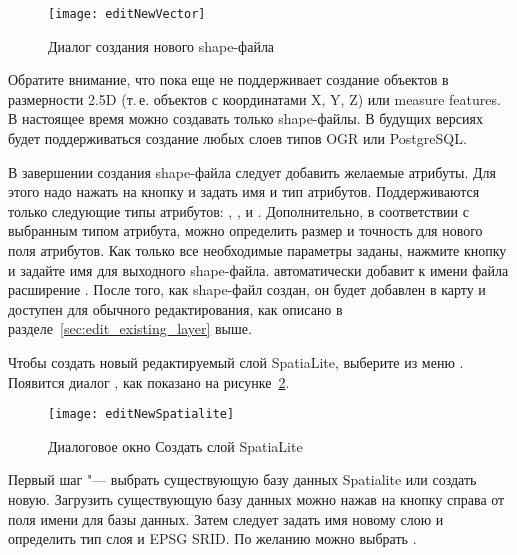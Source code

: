 \begin{figure}[ht]
   \centering
   \texttt{[image: editNewVector]}
   \caption{Диалог создания нового shape-файла \nixcaption}\label{fig:newvectorlayer}
\end{figure}

Обратите внимание, что \qg пока еще не поддерживает создание объектов в
размерности 2.5D (т.\,е. объектов с координатами X, Y, Z) или measure features.
В настоящее время можно создавать только shape-файлы. В будущих
версиях \qg будет поддерживаться создание любых слоев типов OGR или PostgreSQL.

В завершении создания shape-файла следует добавить желаемые атрибуты. Для
этого надо нажать на кнопку   и задать имя и тип атрибутов.
Поддерживаются только следующие типы атрибутов:  ,
, и .
Дополнительно, в соответствии с выбранным типом атрибута, можно определить
размер и точность для нового поля атрибутов. Как только все необходимые
параметры заданы, нажмите кнопку  и задайте имя для выходного
shape-файла. \qg автоматически добавит к имени файла расширение .
После того, как shape-файл создан, он будет добавлен в карту и доступен для
обычного редактирования, как описано в разделе~\ref{sec:edit_existing_layer} выше.

\label{sec:create spatialite}

Чтобы создать новый редактируемый слой SpatiaLite, выберите 
\arrow {} из меню
. Появится диалог , как
показано на рисунке~\ref{fig:newspatialitelayer}.

\begin{figure}[ht]
   \centering
   \texttt{[image: editNewSpatialite]}
   \caption{Диалоговое окно Создать слой SpatiaLite \nixcaption}\label{fig:newspatialitelayer}
\end{figure}

Первый шаг "--- выбрать существующую базу данных Spatialite или создать
новую. Загрузить существующую базу данных можно нажав на кнопку 
справа от поля имени для базы данных. Затем следует задать имя новому слою и
определить тип слоя и EPSG SRID. По желанию можно выбрать
.

